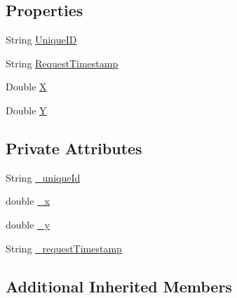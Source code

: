\subsection*{Properties}
\begin{DoxyCompactItemize}
\item 
String \hyperlink{class_web_analyzer_1_1_models_1_1_message_model_1_1_small_data_message_a8ad38d3f87324484d4d9a6ed62656e70}{Unique\+I\+D}
\item 
String \hyperlink{class_web_analyzer_1_1_models_1_1_message_model_1_1_small_data_message_a9238f22b0b40a6e21d69490dcafb1a17}{Request\+Timestamp}
\item 
Double \hyperlink{class_web_analyzer_1_1_models_1_1_message_model_1_1_small_data_message_a26dce64be8d77b383253876ae2bbd06d}{X}
\item 
Double \hyperlink{class_web_analyzer_1_1_models_1_1_message_model_1_1_small_data_message_a4214bf4d6c2c88448e32472cc14f41cd}{Y}
\end{DoxyCompactItemize}
\subsection*{Private Attributes}
\begin{DoxyCompactItemize}
\item 
String \hyperlink{class_web_analyzer_1_1_models_1_1_message_model_1_1_small_data_message_a02f84bd7416e754bb7955a14e5fce9c3}{\+\_\+unique\+Id}
\item 
double \hyperlink{class_web_analyzer_1_1_models_1_1_message_model_1_1_small_data_message_a88d0991ed95524d8e89f945516e859fe}{\+\_\+x}
\item 
double \hyperlink{class_web_analyzer_1_1_models_1_1_message_model_1_1_small_data_message_aa0ed275ee89ea7ba8914cd611aae4c0d}{\+\_\+y}
\item 
String \hyperlink{class_web_analyzer_1_1_models_1_1_message_model_1_1_small_data_message_a84bf885d21fc93c4976626ad87b8a54f}{\+\_\+request\+Timestamp}
\end{DoxyCompactItemize}
\subsection*{Additional Inherited Members}


